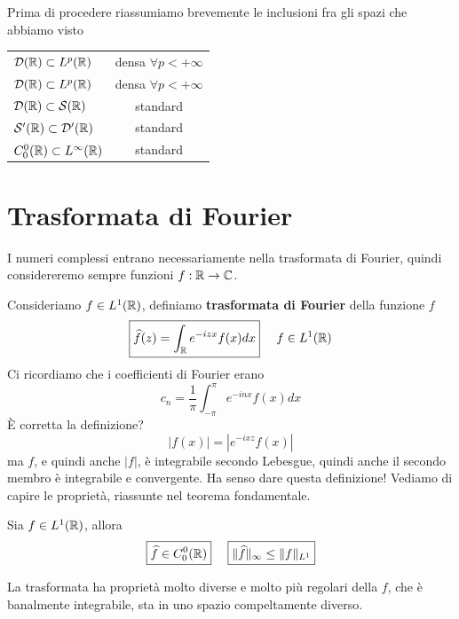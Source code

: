 Prima di procedere riassumiamo brevemente le inclusioni fra gli spazi che abbiamo visto

\begin{center}

\begin{tabular}{lc}
$\mathcal{D}(\mathbb{R}) \subset L^{p}(\mathbb{R})$ & densa $\forall p < + \infty $ \\
$\mathcal{D}(\mathbb{R}) \subset L^{p}(\mathbb{R})$ & densa $\forall p < + \infty $ \\
$\mathcal{D}(\mathbb{R}) \subset \mathcal{S}(\mathbb{R})$ & standard \\
$\mathcal{S}'(\mathbb{R}) \subset \mathcal{D}'(\mathbb{R})$ & standard \\
$C^{0}_{0}(\mathbb{R}) \subset L^{\infty}(\mathbb{R})$ & standard \\

\end{tabular}
\end{center}

\section{Trasformata di Fourier}

I numeri complessi entrano necessariamente nella trasformata di Fourier, quindi considereremo sempre funzioni $f: \mathbb{R}\rightarrow \mathbb{C}$.

Consideriamo $f\in L^{1}(\mathbb{R})$, definiamo \textbf{trasformata di Fourier} della funzione $f$
\begin{equation*}
\boxed{\widehat{f}(z) = \int_{\mathbb{R}} e^{- izx} f(x) dx} \ \ \ \ f\in L^{1}(\mathbb{R})
\end{equation*}
Ci ricordiamo che i coefficienti di Fourier erano
\begin{equation*}
c_{n} = \frac{1}{\pi}\int^{\pi}_{- \pi} e^{- inx} f(x) dx
\end{equation*}
È corretta la definizione?
\begin{equation*}
| f(x)| = \left| e^{- ixz} f(x)\right|
\end{equation*}
ma $f$, e quindi anche $| f| $, è integrabile secondo Lebesgue, quindi anche il secondo membro è integrabile e convergente. Ha senso dare questa definizione! Vediamo di capire le proprietà, riassunte nel teorema fondamentale.
\begin{thm}
 Sia $f\in L^{1}(\mathbb{R})$, allora
\begin{equation*}
\boxed{\hat{f} \in C^{0}_{0}(\RR)} \ \ \ \ \boxed{\Vert \hat{f} \Vert_{\infty} \leq \Vert f \Vert_{L^{1}}}
\end{equation*}
\end{thm}
La trasformata ha proprietà molto diverse e molto più regolari della $f$, che è banalmente integrabile, sta in uno spazio compeltamente diverso.

